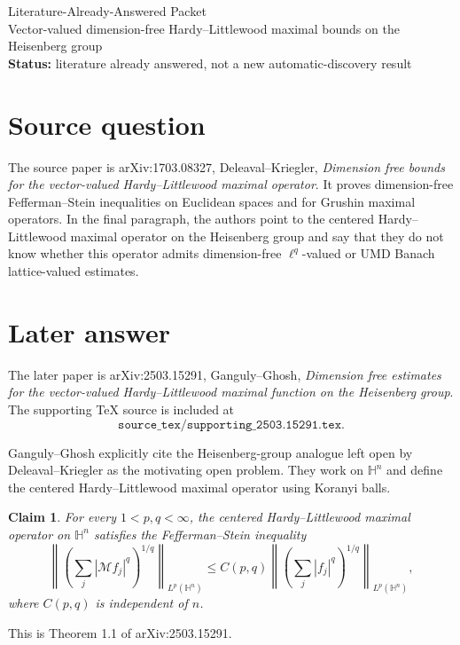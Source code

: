 \documentclass[11pt]{article}
\newtheorem*{claim}{Claim}
\begin{document}
\begin{center}
{\Large Literature-Already-Answered Packet}\\[0.25em]
{\large Vector-valued dimension-free Hardy--Littlewood maximal bounds on the Heisenberg group}\\[0.35em]
\textbf{Status:} literature already answered, not a new automatic-discovery result
\end{center}

\section*{Source question}

The source paper is arXiv:1703.08327, Deleaval--Kriegler,
\emph{Dimension free bounds for the vector-valued Hardy--Littlewood maximal
operator}.
It proves dimension-free Fefferman--Stein inequalities on Euclidean spaces and
for Grushin maximal operators. In the final paragraph, the authors point to the
centered Hardy--Littlewood maximal operator on the Heisenberg group and say
that they do not know whether this operator admits dimension-free
\(\ell^q\)-valued or UMD Banach lattice-valued estimates.

\section*{Later answer}

The later paper is arXiv:2503.15291, Ganguly--Ghosh,
\emph{Dimension free estimates for the vector-valued Hardy--Littlewood maximal
function on the Heisenberg group}.
The supporting TeX source is included at
\[
\texttt{source\_tex/supporting\_2503.15291.tex}.
\]

Ganguly--Ghosh explicitly cite the Heisenberg-group analogue left open by
Deleaval--Kriegler as the motivating open problem. They work on
\(\mathbb H^n\) and define the centered Hardy--Littlewood maximal operator
using Koranyi balls.

\begin{claim}
For every \(1<p,q<\infty\), the centered Hardy--Littlewood maximal operator on
\(\mathbb H^n\) satisfies the Fefferman--Stein inequality
\[
\left\|\left(\sum_j |\mathcal M f_j|^q\right)^{1/q}\right\|_{L^p(\mathbb H^n)}
\le C(p,q)
\left\|\left(\sum_j |f_j|^q\right)^{1/q}\right\|_{L^p(\mathbb H^n)},
\]
where \(C(p,q)\) is independent of \(n\).
\end{claim}

This is Theorem 1.1 of arXiv:2503.15291.
\end{document}
